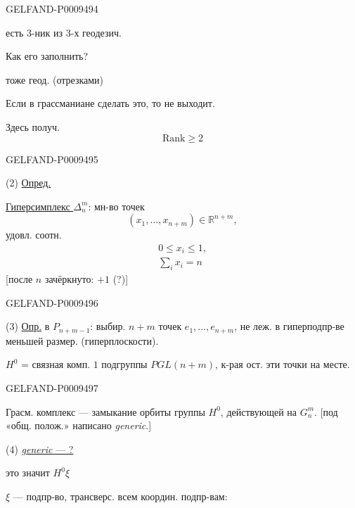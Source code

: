 \begin{GelfandAdjacentEvidence}{GELFAND-P000949}{4}

есть 3-ник из 3-х геодезич.

Как его заполнить?

тоже геод. (отрезками)

Если в грассманиане сделать это, то не выходит.

Здесь получ.
\[
 \mathrm{Rank}\geqslant 2
\]
\end{GelfandAdjacentEvidence}
\begin{GelfandAdjacentEvidence}{GELFAND-P000949}{5}


(2) \underline{Опред.}\par
\underline{Гиперсимплекс $\Delta_n^m$}: мн-во точек
\[
 (x_1,\ldots,x_{n+m})\in\mathbb R^{n+m},
\]
удовл. соотн.
\begin{gather*}
 0\leq x_i\leq 1,\\
 \sum_i x_i=n
\end{gather*}
[после $n$ зачёркнуто: \sout{\mbox{\(+1\)}} (?)]
\end{GelfandAdjacentEvidence}
\begin{GelfandAdjacentEvidence}{GELFAND-P000949}{6}


(3) \underline{Опр.}\qquad {} в $P_{n+m-1}$:
выбир. $n+m$ точек $e_1,\ldots,e_{n+m}$, не леж. в гиперподпр-ве меньшей размер. (гиперплоскости).

$H^0$ = связная комп. $1$ подгруппы $PGL(n+m)$, к-рая ост. эти точки на месте.
\end{GelfandAdjacentEvidence}
\begin{GelfandAdjacentEvidence}{GELFAND-P000949}{7}


Грасм. комплекс --- замыкание орбиты  группы $H^0$,
действующей на $G_n^m$.
[под «общ. полож.» написано \textit{generic}.]
\end{GelfandAdjacentEvidence}


(4) \underline{\textit{generic} --- ?}

это значит $H^0\xi$

$\xi$ --- подпр-во, трансверс. всем координ. подпр-вам:

